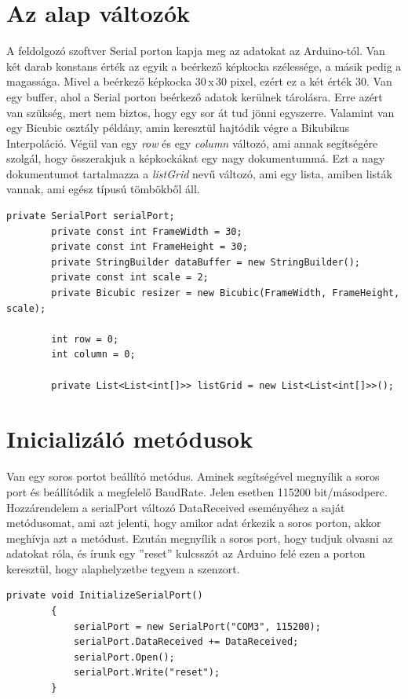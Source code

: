 \documentclass[]{thesis-ekf}
\theoremstyle{definition}
\theoremstyle{remark}
\begin{document}
	\section{Az alap változók}
	A feldolgozó szoftver Serial porton kapja meg az adatokat az Arduino-tól. Van két darab konstans érték az egyik a beérkező képkocka szélessége, a másik pedig a magassága. Mivel a beérkező képkocka 30\,x\,30 pixel, ezért ez a két érték 30. Van egy buffer, ahol a Serial porton beérkező adatok kerülnek tárolásra. Erre azért van szükség, mert nem biztos, hogy egy sor át tud jönni egyszerre. Valamint van egy Bicubic osztály példány, amin keresztül hajtódik végre a Bikubikus Interpoláció. Végül van egy \emph{row} és egy \emph{column} változó, ami annak segítségére szolgál, hogy összerakjuk a képkockákat egy nagy dokumentummá. Ezt a nagy dokumentumot tartalmazza a \emph{listGrid} nevű változó, ami egy lista, amiben listák vannak, ami egész típusú tömbökből áll. 
	\begin{lstlisting}[language=CSharp]
		private SerialPort serialPort;
		private const int FrameWidth = 30; 
		private const int FrameHeight = 30; 
		private StringBuilder dataBuffer = new StringBuilder(); 
		private const int scale = 2;
		private Bicubic resizer = new Bicubic(FrameWidth, FrameHeight, scale);
		
		int row = 0;
		int column = 0;
		
		private List<List<int[]>> listGrid = new List<List<int[]>>();
	\end{lstlisting}
	
	\section{Inicializáló metódusok}
	Van egy soros portot beállító metódus. Aminek segítségével megnyílik a soros port és beállítódik a megfelelő BaudRate. Jelen esetben 115200 bit/másodperc. Hozzárendelem a serialPort változó DataReceived eseményéhez a saját metódusomat, ami azt jelenti, hogy amikor adat érkezik a soros porton, akkor meghívja azt a metódust. Ezután megnyílik a soros port, hogy tudjuk olvasni az adatokat róla, és írunk egy ''reset'' kulcsszót az Arduino felé ezen a porton keresztül, hogy alaphelyzetbe tegyem a szenzort.
	\begin{lstlisting}[language=CSharp]
		private void InitializeSerialPort()
		{
			serialPort = new SerialPort("COM3", 115200);
			serialPort.DataReceived += DataReceived;
			serialPort.Open();
			serialPort.Write("reset");
		}
	\end{lstlisting}
	
\end{document}

